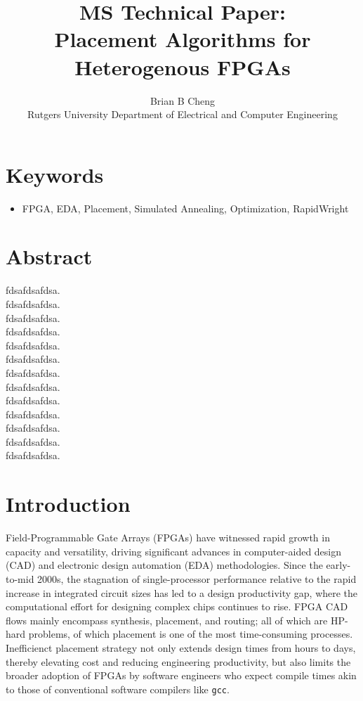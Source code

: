 \documentclass[twocolumn]{article}
\begin{document}
\title{MS Technical Paper: \\ Placement Algorithms for Heterogenous FPGAs}
\author{Brian B Cheng \\ Rutgers University Department of Electrical and Computer Engineering}


\date{}
\maketitle

\section{Keywords}
\begin{itemize}
    \item FPGA, EDA, Placement, Simulated Annealing, Optimization, RapidWright
\end{itemize}


\section{Abstract}
    fdsafdsafdsa. \\ 
    fdsafdsafdsa. \\ 
    fdsafdsafdsa. \\ 
    fdsafdsafdsa. \\ 
    fdsafdsafdsa. \\ 
    fdsafdsafdsa. \\ 
    fdsafdsafdsa. \\ 
    fdsafdsafdsa. \\ 
    fdsafdsafdsa. \\ 
    fdsafdsafdsa. \\ 
    fdsafdsafdsa. \\ 
    fdsafdsafdsa. \\ 
    fdsafdsafdsa. \\ 

\section{Introduction}

    Field-Programmable Gate Arrays (FPGAs) have witnessed rapid growth in capacity and versatility, driving significant advances in computer-aided design (CAD) and electronic design automation (EDA) methodologies. 
    Since the early-to-mid 2000s, the stagnation of single-processor performance relative to the rapid increase in integrated circuit sizes has led to a design productivity gap, where the computational effort for designing complex chips continues to rise. 
    FPGA CAD flows mainly encompass synthesis, placement, and routing; all of which are HP-hard problems, of which placement is one of the most time-consuming processes. 
    Inefficienct placement strategy not only extends design times from hours to days, thereby elevating cost and reducing engineering productivity, but also limits the broader adoption of FPGAs by software engineers who expect compile times akin to those of conventional software compilers like {\tt gcc}. 
\end{document}
